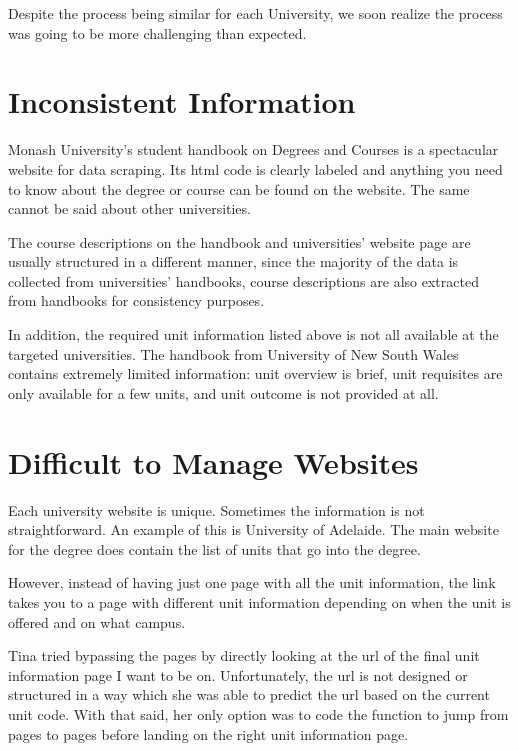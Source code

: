 \documentclass[
  letterpaper,
  DIV=11,
  numbers=noendperiod]{scrreport}
\begin{document}
Despite the process being similar for each University, we soon realize
the process was going to be more challenging than expected.

\hypertarget{inconsistent-information}{%
\section{Inconsistent Information}\label{inconsistent-information}}

Monash University's student handbook on Degrees and Courses is a
spectacular website for data scraping. Its html code is clearly labeled
and anything you need to know about the degree or course can be found on
the website. The same cannot be said about other universities.

The course descriptions on the handbook and universities' website page
are usually structured in a different manner, since the majority of the
data is collected from universities' handbooks, course descriptions are
also extracted from handbooks for consistency purposes.

In addition, the required unit information listed above is not all
available at the targeted universities. The handbook from University of
New South Wales contains extremely limited information: unit overview is
brief, unit requisites are only available for a few units, and unit
outcome is not provided at all.

\hypertarget{difficult-to-manage-websites}{%
\section{Difficult to Manage
Websites}\label{difficult-to-manage-websites}}

Each university website is unique. Sometimes the information is not
straightforward. An example of this is University of Adelaide. The main
website for the degree does contain the list of units that go into the
degree.

However, instead of having just one page with all the unit information,
the link takes you to a page with different unit information depending
on when the unit is offered and on what campus.

Tina tried bypassing the pages by directly looking at the url of the
final unit information page I want to be on. Unfortunately, the url is
not designed or structured in a way which she was able to predict the
url based on the current unit code. With that said, her only option was
to code the function to jump from pages to pages before landing on the
right unit information page.
\end{document}
